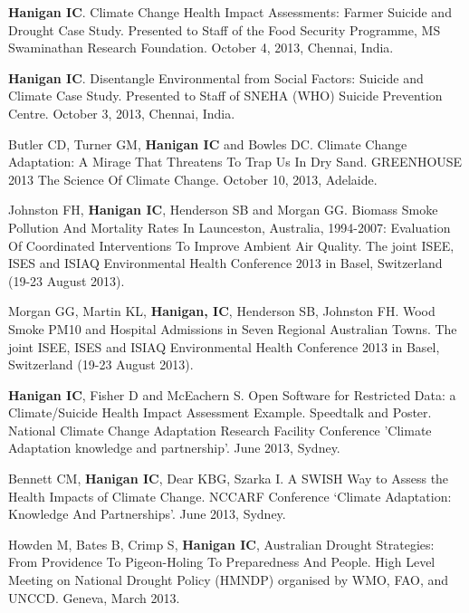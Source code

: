 \documentclass[a4paper,11pt]{article}
\begin{document}
{}
\medskip
\renewcommand{\labelenumi}{\textsc{g}\theenumi.}
\begin{revnumerate}

\item \textbf{Hanigan IC}. Climate Change Health Impact Assessments:  Farmer Suicide and Drought Case Study. Presented to Staff of the Food Security Programme, MS Swaminathan Research Foundation. October 4, 2013, Chennai, India.

\item \textbf{Hanigan IC}.  Disentangle Environmental from Social Factors: Suicide and Climate Case Study. Presented to Staff of SNEHA (WHO) Suicide Prevention Centre. October 3, 2013, Chennai, India.

\item Butler CD, Turner GM, \textbf{Hanigan IC} and Bowles DC. Climate Change Adaptation: A Mirage That Threatens To Trap Us In Dry Sand. GREENHOUSE 2013 The Science Of Climate Change. October 10, 2013, Adelaide.

\item Johnston FH, \textbf{Hanigan IC}, Henderson SB and Morgan GG. Biomass Smoke Pollution And Mortality Rates In Launceston, Australia, 1994-2007: Evaluation Of Coordinated Interventions To Improve Ambient Air Quality.  The joint ISEE, ISES and ISIAQ Environmental Health Conference 2013 in Basel, Switzerland (19-23 August 2013).

\item Morgan GG, Martin KL, \textbf{Hanigan, IC}, Henderson SB, Johnston FH.  Wood Smoke PM10 and Hospital Admissions in Seven Regional Australian Towns.
The joint ISEE, ISES and ISIAQ Environmental Health Conference 2013 in Basel, Switzerland (19-23 August 2013).

\item \textbf{Hanigan IC}, Fisher D and McEachern S. Open Software for Restricted Data: a Climate/Suicide Health Impact Assessment Example. Speedtalk and Poster. National Climate Change Adaptation Research Facility  Conference 'Climate Adaptation knowledge and partnership'. June 2013, Sydney.

\item Bennett CM, \textbf{Hanigan IC}, Dear KBG, Szarka I. A SWISH Way to Assess the Health Impacts of Climate Change. NCCARF Conference ‘Climate Adaptation: Knowledge And Partnerships’. June 2013, Sydney.

\item Howden M, Bates B, Crimp S, \textbf{Hanigan IC}, Australian Drought Strategies: From Providence To Pigeon-Holing To Preparedness And People. High Level Meeting on National Drought Policy (HMNDP) organised by WMO, FAO, and UNCCD. Geneva, March 2013. 


\end{revnumerate}
\end{document}
